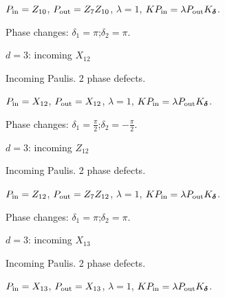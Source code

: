 \vspace{-1mm}
$P_{\rm in}=Z_{10}$, \quad $P_{\rm out}=Z_{7}Z_{10}$, \quad $\lambda=1$, \qquad $K P_{\rm in}=\lambda P_{\rm out}K_{\boldsymbol\delta}$.
\par\smallskip\begin{minipage}{.98\linewidth}\small Phase changes: $\delta_{1}=\pi$;\quad $\delta_{2}=\pi$.\end{minipage}
\vfill
{\footnotesize\texttt{}}
\newpage
{}
{\Large $d=3$: incoming $X_{12}$}\par
Incoming Paulis. 2 phase defects.
\begin{center}
\end{center}
\vspace{-1mm}
$P_{\rm in}=X_{12}$, \quad $P_{\rm out}=X_{12}$, \quad $\lambda=1$, \qquad $K P_{\rm in}=\lambda P_{\rm out}K_{\boldsymbol\delta}$.
\par\smallskip\begin{minipage}{.98\linewidth}\small Phase changes: $\delta_{1}=\frac{\pi}{2}$;\quad $\delta_{2}=-\frac{\pi}{2}$.\end{minipage}
\vfill
{\footnotesize\texttt{}}
\newpage
{}
{\Large $d=3$: incoming $Z_{12}$}\par
Incoming Paulis. 2 phase defects.
\begin{center}
\end{center}
\vspace{-1mm}
$P_{\rm in}=Z_{12}$, \quad $P_{\rm out}=Z_{7}Z_{12}$, \quad $\lambda=1$, \qquad $K P_{\rm in}=\lambda P_{\rm out}K_{\boldsymbol\delta}$.
\par\smallskip\begin{minipage}{.98\linewidth}\small Phase changes: $\delta_{1}=\pi$;\quad $\delta_{2}=\pi$.\end{minipage}
\vfill
{\footnotesize\texttt{}}
\newpage
{}
{\Large $d=3$: incoming $X_{13}$}\par
Incoming Paulis. 2 phase defects.
\begin{center}
\end{center}
\vspace{-1mm}
$P_{\rm in}=X_{13}$, \quad $P_{\rm out}=X_{13}$, \quad $\lambda=1$, \qquad $K P_{\rm in}=\lambda P_{\rm out}K_{\boldsymbol\delta}$.

